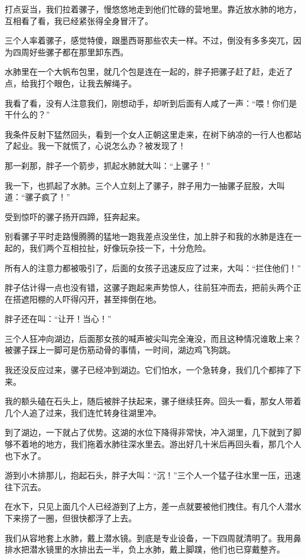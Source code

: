 打点妥当，我们拉着骡子，慢悠悠地走到他们忙碌的营地里。靠近放水肺的地方，互相看了看，我已经紧张得全身冒汗了。

三个人率着骡子，感觉特傻，跟墨西哥那些农夫一样。不过，倒没有多多突兀，因为四周好些骡子都在那里卸东西。

水肺里在一个大帆布包里，就几个包是连在一起的，胖子把骡子赶了赶，走近了点，给我打个眼色，让我去解绳子。

我看了看，没有人注意我们，刚想动手，却听到后面有人咸了一声：“喂！你们是干什么的？”

我条件反射下猛然回头，看到一个女人正朝这里走来，在树下纳凉的一行人也都站了起业。我一下就慌了，心说怎么办？被发现了！

那一刹那，胖子一个箭步，抓起水肺就大叫：“上骡子！”

我一下，也抓起了水肺。三个人立刻上了骡子，胖子用力一抽骡子屁股，大叫道：“骡子疯了！”

受到惊吓的骡子扬开四蹄，狂奔起来。

别看骡子平时走路慢腾腾的猛地一跑我差点没坐住，加上胖子和我的水肺是连在一起的，我们两个互相拉扯，好像玩杂技一下，十分危险。

所有人的注意力都被吸引了，后面的女孩子迅速反应了过来，大叫：“拦住他们！”

胖子估计得一点也没有错，这骡子跑起来声势惊人，往前狂冲而去，把前头两个正在搭遮阳棚的人吓得闪开，甚至摔倒在地。

胖子还在叫：“让开！当心！”

三个人狂冲向湖边，后面那女孩的喊声被尖叫完全淹没，而且这种情况谁敢上来？被骡子踩上一脚可是伤筋动骨的事情，一时间，湖边鸡飞狗跳。

我还没反应过来，骡子已经冲到湖边。它们怕水，一个急转身，我们几个都摔了下来。

我的额头磕在石头上，随后被胖子扶起来，骡子继续狂奔。回头一看，那女人带着几个人追了过来，我们连忙转身往湖里冲。

到了湖边，一下就占了优势。这湖的水位下降得非常快，冲入湖里，几下就到了脚够不着地的地方，我们拖着水肺往深水里去。游出好几十米后再回头看，那几个人也下水了。

游到小木排那儿，抱起石头，胖子大叫：“沉！”三个人一个猛子往水里一压，迅速往下沉去。

在水下，只见上面几个人已经游到了上方，差一点就要被他们拽住。有几个人潜水下来捞了一圈，但很快都浮了上去。

我们从容地套上水肺，戴上潜水镜。到底是专业设备，一下四周就清明了。我用鼻排水把潜水镜里的水排出去一半，负上水肺，戴上脚蹼，他们也已穿戴整齐。

